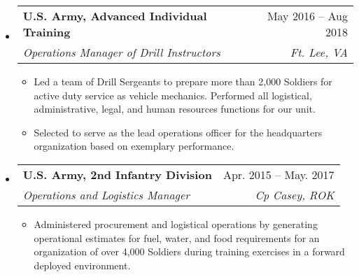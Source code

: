 \documentclass[letterpaper,12pt]{article}[leftmargin=*]
\makeatletter
\def \entryspacing {-0pt}
\renewcommand{\section}[2]{\vspace{5pt}
  \colorbox{secondary}{\color{white}\raggedbottom\normalsize\textbf{{#1}{\hspace{7pt}#2}}}
}
\newcommand{\resumeEntryStart}{\begin{itemize}[leftmargin=2.5mm]}
\newcommand{\resumeEntryEnd}{\end{itemize}\vspace{\entryspacing}}
\newcommand{\resumeItemListStart}{\begin{itemize}[leftmargin=4.5mm]}
\newcommand{\resumeItemListEnd}{\end{itemize}}
\newcommand{\resumeItem}[1]{
  \item\small{
    {#1 \vspace{-2pt}}
  }
}
\newcommand{\resumeEntryTSDL}[4]{
  \vspace{-1pt}\item[]
    \begin{tabularx}{0.97\textwidth}{X@{\hspace{60pt}}r}
      \textbf{\color{primary}#1} & {\firabook\color{accent}\small#2} \\
      \textit{\color{accent}\small#3} & \textit{\color{accent}\small#4} \\
    \end{tabularx}\vspace{-6pt}
}
\newcommand{\resumeEntryTD}[2]{
  \vspace{-1pt}\item[]
    \begin{tabularx}{0.97\textwidth}{X@{\hspace{60pt}}r}
      \textbf{\color{primary}#1} & {\firabook\color{accent}\small#2} \\
    \end{tabularx}\vspace{-6pt}
}
\newcommand{\resumeEntryS}[2]{
  \item[]\small{
    \textbf{\color{primary}#1 }{ #2 \vspace{-6pt}}
  }
}
\makeatother
\begin{document}
  \resumeEntryStart
    \resumeEntryTSDL
      {U.S. Army, Advanced Individual Training}{May 2016 -- Aug 2018}
      {Operations Manager of Drill Instructors}{Ft. Lee, VA}
    \resumeItemListStart
        \resumeItem {Led a team of Drill Sergeants to prepare more than 2,000 Soldiers for active duty service as vehicle mechanics. Performed all logistical, administrative, legal, and human resources functions for our unit.}
        \resumeItem {Selected to serve as the lead operations officer for the headquarters organization based on exemplary performance.}
    \resumeItemListEnd
  \resumeEntryEnd

  \resumeEntryStart
    \resumeEntryTSDL
      {U.S. Army, 2nd Infantry Division}{Apr. 2015 -- May. 2017}
      {Operations and Logistics Manager}{Cp Casey, ROK}
    \resumeItemListStart
      \resumeItem {Administered procurement and logistical operations by generating operational estimates for fuel, water, and food requirements for an organization of over 4,000 Soldiers during training exercises in a forward deployed environment.}
    \resumeItemListEnd
  \resumeEntryEnd






\end{document}
